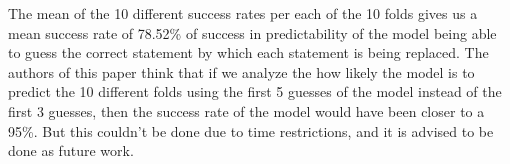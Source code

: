 \begin{table*}
	\centering
\caption{10-fold cross validation of the probabilistic model}
\label{tab:cross-validation}
\end{table*}

The mean of the 10 different success rates per each of the 10 folds gives us a mean success rate of 78.52\% of success in predictability of the model being able to guess the correct statement by which each statement is being replaced.  
The authors of this paper think that if we analyze the how likely the model is to predict the 10 different folds using the first 5 guesses of the model instead of the first 3 guesses, then the success rate of the model would have been closer to a 95\%. But this couldn't be done due to time restrictions, and it is advised to be done as future work.
